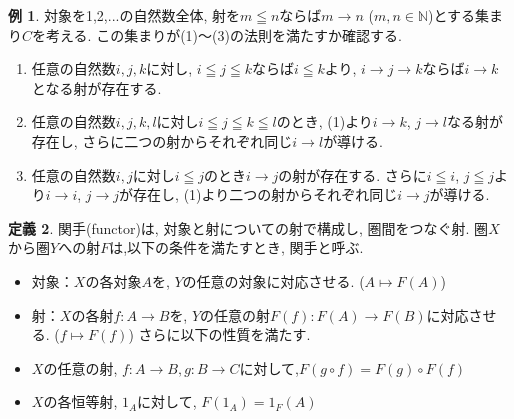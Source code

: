 \documentclass[a4paper]{jsarticle}
\theoremstyle{definition}
\newtheorem{dfn}{定義}[section]
\newtheorem{exam}[dfn]{例}
\begin{document}
\begin{exam}
対象を1,2,...の自然数全体, 射を$m\leqq n$ならば$m \rightarrow n$ ($m, n \in \mathbb{N}$)とする集まり$C$を考える. この集まりが(1)～(3)の法則を満たすか確認する. 
 \begin{enumerate}[(1)]
        \item 任意の自然数$i, j, k$に対し, $i\leqq j\leqq k$ならば$i\leqq k$より, $i\rightarrow j\rightarrow k$ならば$i\rightarrow k$となる射が存在する.
        \item 任意の自然数$i, j, k, l$に対し$i\leqq j\leqq k\leqq l$のとき, (1)より$i\rightarrow k$, $j \rightarrow l$なる射が存在し, さらに二つの射からそれぞれ同じ$i\rightarrow l$が導ける.
        \item 任意の自然数$i, j$に対し$i\leqq j$のとき$i\rightarrow j$の射が存在する. さらに$i\leqq i$, $j\leqq j$より$i\rightarrow i$, $j\rightarrow j$が存在し, (1)より二つの射からそれぞれ同じ$i\rightarrow j$が導ける.\\
\end{enumerate}
\end{exam}
\begin{dfn}
    関手(functor)は, 対象と射についての射で構成し, 圏間をつなぐ射. 圏$X$から圏$Y$への射$F$は,以下の条件を満たすとき, 関手と呼ぶ.
    \begin{itemize}
        \item 対象：$X$の各対象$A$を, $Y$の任意の対象に対応させる. ($A\longmapsto F(A)$)
        \item 射：$X$の各射$f:A\rightarrow B$を, $Y$の任意の射$F(f): F(A)\rightarrow F(B)$に対応させる. ($f\longmapsto F(f)$) さらに以下の性質を満たす.
    \end{itemize}
    \begin{itemize}
        \item[(1)] $X$の任意の射, $f:A\rightarrow B, g:B\rightarrow C$に対して,$F(g\circ f) = F(g)\circ F(f)$
        \item[(2)] $X$の各恒等射, $1_A$に対して, $F(1_A) = 1_F(A)$
    \end{itemize}
    
\end{dfn}
\end{document}
